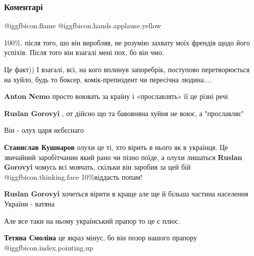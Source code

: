  
 
 
 
 
\subsubsection{Коментарі}
\label{sec:26_09_2021.fb.gorovyj_ruslan.1.usik_vatnyj_hxx_hristos.cmt}

\begin{itemize} %
 @igg{fbicon.flame}  @igg{fbicon.hands.applause.yellow} 

100\%. після того, шо він виробляв, не розумію захвату моїх френдів щодо його
успіхів. Після того він взагалі мені пох, бо він чмо.


Це факт)) І взагалі, всі, на кого вплинув запоребрік, поступово перетворюється
на хуйло, будь то боксер, комік-препиздент чи пересічна людина....

\begin{itemize} %
\textbf{Anton Nemo} просто воювать за країну і «прославлять» її це різні речі

\textbf{Ruslan Gorovyi} , от дійсно що та бавовняна хуйня не воює, а "прославляє"
\end{itemize} %

Він - олух царя нєбєснаго

\begin{itemize} %
\textbf{Станислав Кушнаров} олухи це ті, хто вірить в нього як в українця. Це звичайний заробітчанин який рано чи пізно поїде, а олухи лишаться
\textbf{Ruslan Gorovyi} чомусь всі мовчать, скільки він заробив за цей бій @igg{fbicon.thinking.face} 10\%віддасть попам!

\textbf{Ruslan Gorovyi} хочеться вірити в краще але ще й більша частина населення України - ватяна

Але все таки на ньому український прапор то це є плюс.

\textbf{Тетяна Смоліна} це якраз мінус, бо він позор нашого прапору @igg{fbicon.index.pointing.up}


\end{itemize}
\end{itemize}
